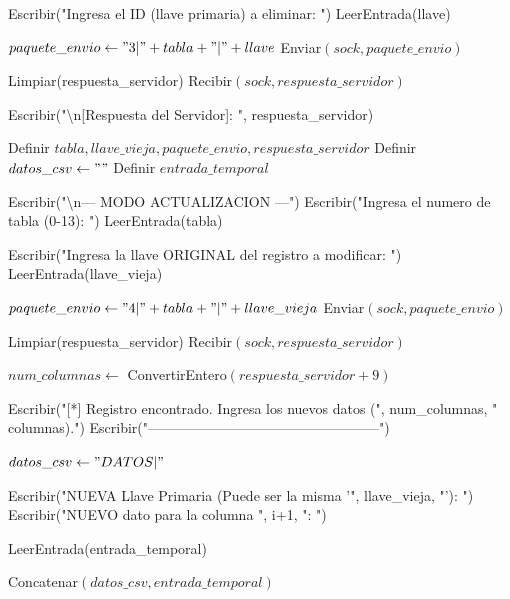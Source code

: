 \begin{tcolorbox}[colback=white, colframe=azul_unam, 
title=Pseudocódigo: cliente.c, breakable]
\begin{algorithmic}[1]
\State Escribir("Ingresa el ID (llave primaria) a eliminar: ")
\State LeerEntrada(llave)

\State $paquete\_envio \gets "3|" + tabla + "|" + llave$
\State Enviar$(sock, paquete\_envio)$

\State Limpiar(respuesta\_servidor)
\State Recibir$(sock, respuesta\_servidor)$

\State Escribir("\textbackslash n[Respuesta del Servidor]: ", respuesta\_servidor)

\EndProcedure

\vspace{0.3cm}



\State Definir $tabla, llave\_vieja, paquete\_envio, respuesta\_servidor$
\State Definir $datos\_csv \gets ""$
\State Definir $entrada\_temporal$

\State Escribir("\textbackslash n--- MODO ACTUALIZACION ---")
\State Escribir("Ingresa el numero de tabla (0-13): ")
\State LeerEntrada(tabla)

\State Escribir("Ingresa la llave ORIGINAL del registro a modificar: ")
\State LeerEntrada(llave\_vieja)

\State $paquete\_envio \gets "4|" + tabla + "|" + llave\_vieja$
\State Enviar$(sock, paquete\_envio)$

\State Limpiar(respuesta\_servidor)
\State Recibir$(sock, respuesta\_servidor)$


    \State $num\_columnas \gets$ ConvertirEntero$(respuesta\_servidor + 9)$

    \State Escribir("[*] Registro encontrado. Ingresa los nuevos datos (", num\_columnas, " columnas).")
    \State Escribir("--------------------------------------------------")

    \State $datos\_csv \gets "DATOS|"$


            \State Escribir("NUEVA Llave Primaria (Puede ser la misma '", llave\_vieja, "'): ")
        \Else
            \State Escribir("NUEVO dato para la columna ", i+1, ": ")
        \EndIf

        \State LeerEntrada(entrada\_temporal)

        \State Concatenar$(datos\_csv, entrada\_temporal)$


\end{algorithmic}
\end{tcolorbox}
